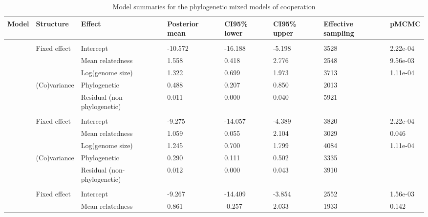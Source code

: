 \begin{table}

\caption{\label{tab:}Model summaries for the phylogenetic mixed models of cooperation}
\centering
\begin{tabular}[t]{llllllll}
\toprule
Model & Structure & Effect & Posterior
 mean & CI95\% lower & CI95\% upper & Effective
 sampling & pMCMC\\
\midrule
\addlinespace[0.3em]
\multicolumn{8}{l}{\textbf{Siderophores}}\\
\hspace{1em} & Fixed effect & Intercept & -10.572 & -16.188 & -5.198 & 3528 & 2.22e-04\\
\hspace{1em} &  & Mean relatedness & 1.558 & 0.418 & 2.776 & 2548 & 9.56e-03\\
\hspace{1em} &  & Log(genome size) & 1.322 & 0.699 & 1.973 & 3713 & 1.11e-04\\
\hspace{1em} & (Co)variance & Phylogenetic & 0.488 & 0.207 & 0.850 & 2013 & \\
\hspace{1em} &  & Residual (non-phylogenetic) & 0.011 & 0.000 & 0.040 & 5921 & \\
\addlinespace[0.3em]
\multicolumn{8}{l}{\textbf{Biofilm}}\\
\hspace{1em} & Fixed effect & Intercept & -9.275 & -14.057 & -4.389 & 3820 & 2.22e-04\\
\hspace{1em} &  & Mean relatedness & 1.059 & 0.055 & 2.104 & 3029 & 0.046\\
\hspace{1em} &  & Log(genome size) & 1.245 & 0.700 & 1.799 & 4084 & 1.11e-04\\
\hspace{1em} & (Co)variance & Phylogenetic & 0.290 & 0.111 & 0.502 & 3335 & \\
\hspace{1em} &  & Residual (non-phylogenetic) & 0.012 & 0.000 & 0.043 & 3910 & \\
\addlinespace[0.3em]
\multicolumn{8}{l}{\textbf{Antibiotic degradation}}\\
\hspace{1em} & Fixed effect & Intercept & -9.267 & -14.409 & -3.854 & 2552 & 1.56e-03\\
\hspace{1em} &  & Mean relatedness & 0.861 & -0.257 & 2.033 & 1933 & 0.142\\

\end{tabular}
\end{table}
